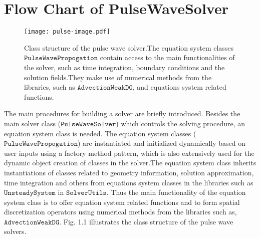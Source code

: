 \section{Flow Chart of PulseWaveSolver}
\begin{figure}[b]
\centering
\texttt{[image: pulse-image.pdf]} 
\caption{Class structure of the pulse wave solver.The equation system classes $\texttt{PulseWavePropogation}$ contain access to the main functionalities of the solver, such as time integration, boundary conditions and the solution fields.They make use of numerical methods from the libraries, such as $\texttt{AdvectionWeakDG}$, and equations system related functions.}
\label{img} 
\end{figure}
The main procedures for building a solver are briefly introduced. Besides the main solver class ($\texttt{PulseWaveSolver}$) which controls the solving procedure, an equation system class is needed. The equation system classes ($\texttt{PulseWavePropogation}$) are instantiated and initialized dynamically based on user inputs using a factory method pattern, which is also extensively used for the dynamic object creation of classes in the solver.The equation system class inherits instantiations of classes related to geometry information, solution approximation, time integration and others from equations system classes in the libraries such as $\texttt{UnsteadySystem}$  in $\texttt{SolverUtils}$. Thus the main functionality of the equation system class is to offer equation system related functions and to form spatial discretization operators using numerical methods from the libraries such as, $\texttt{AdvectionWeakDG}$. Fig. 1.1 illustrates the class structure of the pulse wave solvers. 

